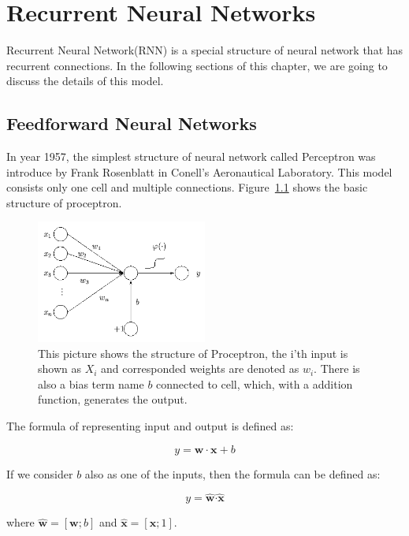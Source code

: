 \documentclass[officiallayout]{tktla}
\begin{document}
\chapter{Recurrent Neural Networks}
Recurrent Neural Network(RNN) is a special structure of neural network that has recurrent connections. In the following sections of this chapter, we are going to discuss the details of this model.
\section{Feedforward Neural Networks}
In year 1957, the simplest structure of neural network called Perceptron was introduce by Frank Rosenblatt in Conell's Aeronautical Laboratory. This model consists only one cell and multiple connections. Figure~\ref{proceptron} shows the basic structure of proceptron.
\begin{figure}[h!]

  \centering
    \includegraphics[width=0.5\textwidth]{proceptron}
  \caption{This picture shows the structure of Proceptron, the i'th input is shown as $X_i$ and corresponded weights are denoted as $w_i$. There is also a bias term name $b$ connected to cell, which, with a addition function, generates the output.}\label{proceptron}
\end{figure}

The formula of representing input and output is defined as:

\begin{equation}
y = \mathbf{w}\cdot\mathbf{x} + b
\end{equation}

If we consider $b$ also as one of the inputs, then the formula can be defined as:

\begin{equation}
y = \hat{\mathbf{w}}\hat{\cdot\mathbf{x}}
\end{equation}\label{pronceptron_formula}

where $ \hat{\mathbf{w}} = [\mathbf{w};b] $ and $\hat{\mathbf{x}} = [\mathbf{x};1]$.
\end{document}
